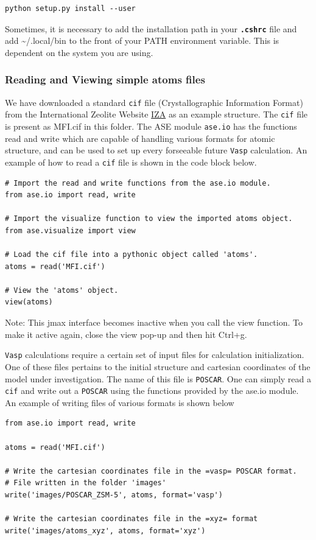 \documentclass[11pt]{article}
\begin{document}
\begin{verbatim}
python setup.py install --user
\end{verbatim}

Sometimes, it is necessary to add the installation path in your \textbf{\texttt{.cshrc}} file and add \textasciitilde{}/.local/bin to the front of your PATH environment variable. This is dependent on the system you are using. 

\subsubsection{Reading and Viewing simple atoms files}
\label{sec-5-0-2}
We have downloaded a standard \texttt{cif} file (Crystallographic Information Format) from the International Zeolite Website \href{http://www.iza-online.org/}{IZA} as an example structure. The \texttt{cif} file is present as MFI.cif in this folder. 
The ASE module \texttt{ase.io} has the functions read and write which are capable of handling various formats for atomic structure, and can be used to set up every forseeable future \texttt{Vasp} calculation. An example of how to read a \texttt{cif} file is shown in the code block below.

\begin{verbatim}
# Import the read and write functions from the ase.io module.
from ase.io import read, write

# Import the visualize function to view the imported atoms object.
from ase.visualize import view

# Load the cif file into a pythonic object called 'atoms'.
atoms = read('MFI.cif')

# View the 'atoms' object.
view(atoms)
\end{verbatim}

Note: This jmax interface becomes inactive when you call the view function. To make it active again, close the view pop-up and then hit Ctrl+g.

\texttt{Vasp} calculations require a certain set of input files for calculation initialization. One of these files pertains to the initial structure and cartesian coordinates of the model under investigation. The name of this file is \texttt{POSCAR}. One can simply read a \texttt{cif} and write out a \texttt{POSCAR} using the functions provided by the ase.io module. An example of writing files of various formats is shown below

\begin{verbatim}
from ase.io import read, write

atoms = read('MFI.cif')

# Write the cartesian coordinates file in the =vasp= POSCAR format.
# File written in the folder 'images'
write('images/POSCAR_ZSM-5', atoms, format='vasp')

# Write the cartesian coordinates file in the =xyz= format
write('images/atoms_xyz', atoms, format='xyz')
\end{verbatim}
\end{document}
